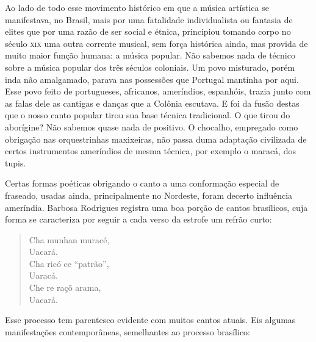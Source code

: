 


Ao lado de todo esse movimento histórico em que a música artística se
manifestava, no Brasil, mais por uma fatalidade individualista ou
fantasia de elites que por uma razão de ser social e étnica, principiou
tomando corpo no século \textsc{xix} uma outra corrente musical, sem força
histórica ainda, mas provida de muito maior função humana: a música
popular. Não sabemos nada de técnico sobre a música popular dos três
séculos coloniais. Um povo misturado, porém inda não amalgamado, parava
nas possessões que Portugal mantinha por aqui. Esse povo feito de
portugueses, africanos, ameríndios, espanhóis, trazia junto com as falas
dele as cantigas e danças que a Colônia escutava. E foi da fusão destas
que o nosso canto popular tirou sua base técnica tradicional. O que
tirou do aborígine? Não sabemos quase nada de positivo. O chocalho,
empregado como obrigação nas orquestrinhas maxixeiras, não passa duma
adaptação civilizada de certos instrumentos ameríndios de mesma técnica,
por exemplo o maracá, dos tupis.

Certas formas poéticas obrigando o canto a uma conformação especial de
fraseado, usadas ainda, principalmente no Nordeste, foram decerto
influência ameríndia. Barbosa Rodrigues registra uma boa porção de
cantos brasílicos, cuja forma se caracteriza por seguir a cada verso da
estrofe um refrão curto:

\begin{verse}
Cha munhan muracé,\\
Uacará.\\
Cha ricó ce ``patrão'',\\
Uaracá.\\
Che re raçõ arama,\\
Uacará.
\end{verse}

Esse processo tem parentesco evidente com muitos cantos atuais. Eis
algumas manifestações contemporâneas, semelhantes ao processo brasílico:

